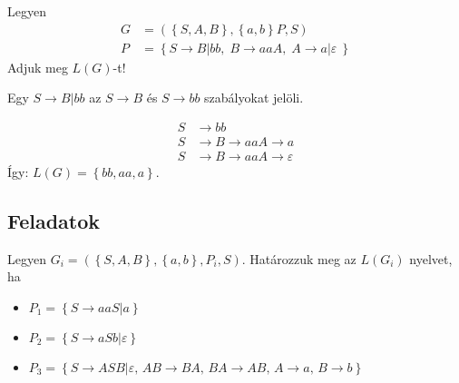\begin{example}
	Legyen
	\begin{align*}
		G &= \left( \left\lbrace S, A, B \right\rbrace, \left\lbrace a,b \right\rbrace P, S \right) \\
		P &= \left\lbrace S \rightarrow B | bb, \; B \rightarrow aaA, \; A \rightarrow a | \varepsilon \ \right\rbrace 
	\end{align*}
	Adjuk meg $L(G)$-t!

	\begin{remark}
		Egy $ S \rightarrow B | bb $ az $ S \rightarrow B $ és $ S \rightarrow bb $ szabályokat jelöli.
	\end{remark}

	\begin{align*}
		S &\rightarrow bb \\
		S &\rightarrow B \rightarrow aaA \rightarrow a \\
		S &\rightarrow B \rightarrow aaA \rightarrow \varepsilon
	\end{align*}
	Így: $L(G) = \left\lbrace bb, aa, a \right\rbrace $. 
\end{example}

\subsection{Feladatok}

\begin{exercise}
	Legyen $ G_i = (\left\lbrace S, A, B \right\rbrace, \left\lbrace a,b \right\rbrace, P_i, S) $. Határozzuk meg az $L(G_i)$ nyelvet, ha
	\begin{itemize}
		\item $P_1 = \left\lbrace S \rightarrow aaS | a \right\rbrace $
		\item $P_2 = \left\lbrace S \rightarrow aSb | \varepsilon \right\rbrace $
		\item $P_3 = \left\lbrace S \rightarrow ASB | \varepsilon, \, AB \rightarrow BA, \, BA \rightarrow AB, \, A \rightarrow a, \, B \rightarrow b \right\rbrace $
	\end{itemize}
\end{exercise}
		
